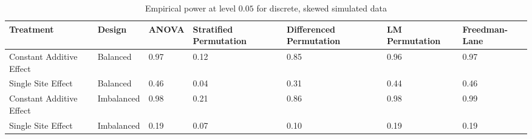 \begin{table}[ht]
\centering
\begin{tabular}{p{1.25in}|p{0.7in}|p{0.6in}p{0.8in}p{0.8in}p{0.8in}p{0.75in}}
  \hline
Treatment & Design & ANOVA & Stratified Permutation & Differenced Permutation & LM Permutation & Freedman-Lane \\ 
  \hline
Constant Additive Effect & Balanced & 0.97 & 0.12 & 0.85 & 0.96 & 0.97 \\ 
  Single Site Effect & Balanced & 0.46 & 0.04 & 0.31 & 0.44 & 0.46 \\ 
  Constant Additive Effect & Imbalanced & 0.98 & 0.21 & 0.86 & 0.98 & 0.99 \\ 
  Single Site Effect & Imbalanced & 0.19 & 0.07 & 0.10 & 0.19 & 0.19 \\ 
   \hline
\end{tabular}
\caption{Empirical power at level $0.05$ for discrete, skewed simulated data} 
\end{table}

